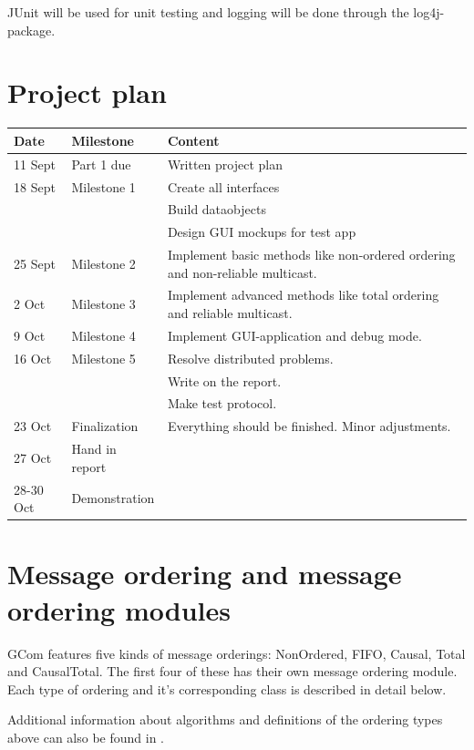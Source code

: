 \documentclass[english]{article}
\begin{document}
JUnit will be used for unit testing and logging will be done through the log4j-package. 

\section{Project plan}
\begin{tabular}{|l|l|l|}
\hline
Date	&	Milestone	&	Content \\
\hline
11 Sept	&	Part 1 due	&	Written project plan \\
18 Sept &	Milestone 1 &	Create all interfaces \\ 
						&&	Build dataobjects \\
						&&	Design GUI mockups for test app \\
25 Sept &	Milestone 2 & 	Implement basic methods like non-ordered ordering and non-reliable multicast. \\
2 Oct	&	Milestone 3 & 	Implement advanced methods like total ordering and reliable multicast. \\
9 Oct	&	Milestone 4 & 	Implement GUI-application and debug mode. \\
16 Oct	&	Milestone 5 & 	Resolve distributed problems. \\ && Write on the report.\\ && Make test protocol. \\
23 Oct	&	Finalization 	& Everything should be finished. Minor adjustments. \\
27 Oct	&	Hand in report 	& \\
28-30 Oct & Demonstration	& \\
\hline
\end{tabular}




\section{Message ordering and message ordering modules}
GCom features five kinds of message orderings: NonOrdered, FIFO, Causal, Total and CausalTotal. The first four of these has their own message ordering module. Each type of ordering and it's corresponding class is described in detail below.

Additional information about algorithms and definitions of the ordering types above can also be found in \cite{distsys-ordering}.
\end{document}
